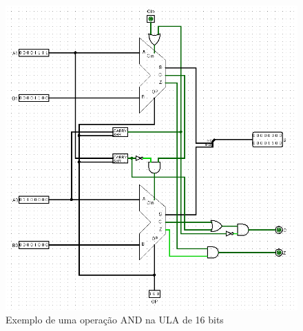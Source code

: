 \documentclass[
	12pt,				%
	openright,			%
	twoside,			%
	a4paper,			%
	english,			%
	french,				%
	spanish,			%
	brazil,				%
	]{abntex2}
\begin{document}
\begin{apendicesenv}
\begin{itemize}
\begin{figure}[H]
	\begin{center}
	    \includegraphics[scale=0.55]{imagens/ULA16AND.png}
	\end{center}
\caption{\label{ula16and}Exemplo de uma operação AND na ULA de 16 bits}
\end{figure}


\end{itemize}
\end{apendicesenv}
\end{document}
